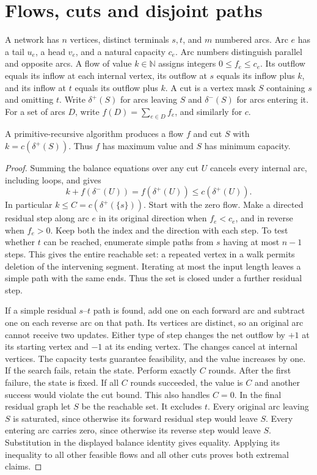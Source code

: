 \section{Flows, cuts and disjoint paths}\label{fl:flows}

A network has $n$ vertices, distinct terminals $s,t$, and $m$ numbered
arcs. Arc $e$ has a tail $u_e$, a head $v_e$, and a natural capacity
$c_e$. Arc numbers distinguish parallel and opposite arcs. A flow of value
$k\in\mathbb N$ assigns integers $0\le f_e\le c_e$. Its outflow equals
its inflow at each internal vertex, its outflow at $s$ equals its inflow
plus $k$, and its inflow at $t$ equals its outflow plus $k$. A cut is a
vertex mask $S$ containing $s$ and omitting $t$. Write $\delta^+(S)$ for
arcs leaving $S$ and $\delta^-(S)$ for arcs entering it. For a set of
arcs $D$, write $f(D)=\sum_{e\in D}f_e$, and similarly for $c$.

\begin{theorem}\leavevmode\label{fl:main}
A primitive-recursive algorithm produces a flow $f$ and cut $S$ with
$k=c(\delta^+(S))$. Thus $f$ has maximum value and $S$ has minimum
capacity.
\end{theorem}
\begin{proof}
Summing the balance equations over any cut $U$ cancels every internal
arc, including loops, and gives
\[
             k+f(\delta^-(U))=f(\delta^+(U))\le c(\delta^+(U)).
\]
In particular $k\le C=c(\delta^+(\{s\}))$.
Start with the zero flow. Make a directed residual step along arc $e$
in its original direction when $f_e<c_e$, and in reverse when $f_e>0$.
Keep both the index and the direction with each step. To test whether
$t$ can be reached, enumerate simple paths from $s$ having at most
$n-1$ steps. This gives the entire reachable set: a repeated vertex in
a walk permits deletion of the intervening segment. Iterating at most
the input length leaves a simple path with the same ends. Thus the set
is closed under a further residual step.

If a simple residual $s$--$t$ path is found, add one on each forward
arc and subtract one on each reverse arc on that path. Its vertices are
distinct, so an original arc cannot receive two updates. Either type of
step changes the net outflow by $+1$ at its starting vertex and $-1$ at
its ending vertex. The changes cancel at internal vertices. The
capacity tests guarantee feasibility, and the value increases by one.
If the search fails, retain the state. Perform exactly $C$ rounds.
After the first failure, the state is fixed. If all $C$ rounds
succeeded, the value is $C$ and another success would violate the cut
bound. This also handles $C=0$. In the final residual graph let $S$ be
the reachable set. It excludes $t$. Every original arc leaving $S$
is saturated, since otherwise its forward residual step would leave
$S$. Every entering arc carries zero, since otherwise its reverse
step would leave $S$. Substitution in the displayed balance identity
gives equality. Applying its inequality to all other feasible flows
and all other cuts proves both extremal claims.
\end{proof}

